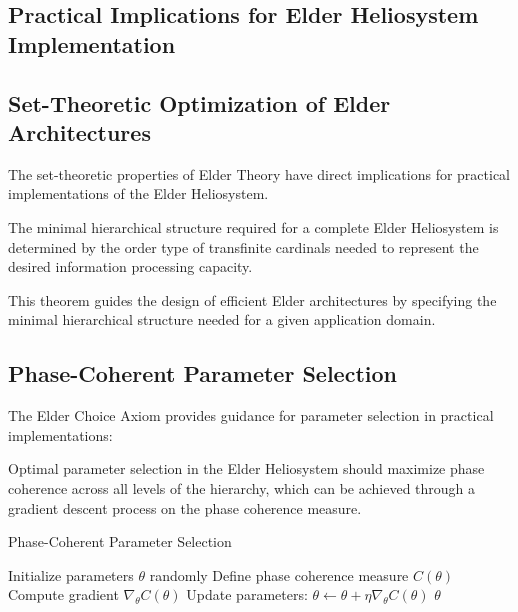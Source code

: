 \begin{theorem}
\begin{definition}
\begin{definition}
\begin{enumerate}
\begin{definition}
\begin{definition}
\begin{definition}
\section{Practical Implications for Elder Heliosystem Implementation}

\subsection{Set-Theoretic Optimization of Elder Architectures}

The set-theoretic properties of Elder Theory have direct implications for practical implementations of the Elder Heliosystem.

\begin{theorem}
The minimal hierarchical structure required for a complete Elder Heliosystem is determined by the order type of transfinite cardinals needed to represent the desired information processing capacity.
\end{theorem}

This theorem guides the design of efficient Elder architectures by specifying the minimal hierarchical structure needed for a given application domain.

\subsection{Phase-Coherent Parameter Selection}

The Elder Choice Axiom provides guidance for parameter selection in practical implementations:

\begin{proposition}
Optimal parameter selection in the Elder Heliosystem should maximize phase coherence across all levels of the hierarchy, which can be achieved through a gradient descent process on the phase coherence measure.
\end{proposition}

\begin{algorithm}[h]
\caption{Phase-Coherent Parameter Selection}
\begin{algorithmic}[1]
\State Initialize parameters $\theta$ randomly
\State Define phase coherence measure $C(\theta)$
\State Compute gradient $\nabla_{\theta} C(\theta)$
\State Update parameters: $\theta \leftarrow \theta + \eta \nabla_{\theta} C(\theta)$
\EndWhile
\State \Return $\theta$
\end{algorithmic}
\end{algorithm}


\end{definition}
\end{definition}
\end{definition}
\end{enumerate}
\end{definition}
\end{definition}
\end{theorem}
